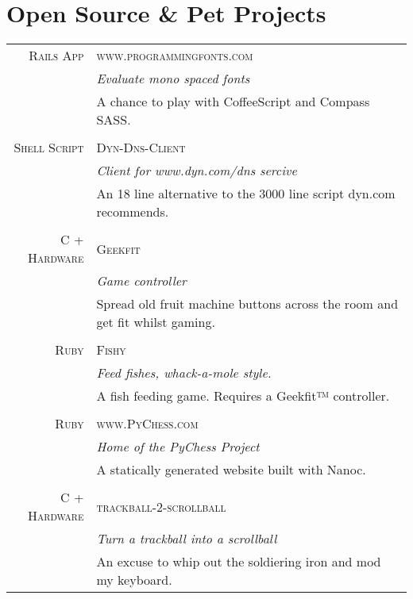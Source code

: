 \documentclass[a4paper,11pt]{article}
\begin{document}
\section{Open Source \& Pet Projects}
\begin{tabular}{r|p{11.2cm}}
  \textsc{Rails App} &\textsc{www.programmingfonts.com}\\
                     &\emph{Evaluate mono spaced fonts}\\
                     &\footnotesize{A chance to play with CoffeeScript and Compass SASS.}
  \\\multicolumn{2}{c}{} \\
  \textsc{Shell Script} &\textsc{Dyn-Dns-Client}\\
                        &\emph{Client for www.dyn.com/dns sercive}\\
                        &\footnotesize{An 18 line alternative to the 3000 line script dyn.com recommends.}
  \\\multicolumn{2}{c}{} \\
  \textsc{C + Hardware} &\textsc{Geekfit}\\
                        &\emph{Game controller}\\
                        &\footnotesize{Spread old fruit machine buttons across the room and get fit whilst gaming.}
  \\\multicolumn{2}{c}{} \\
  \textsc{Ruby}         &\textsc{Fishy}\\
                        &\emph{Feed fishes, whack-a-mole style.}\\
                        &\footnotesize{A fish feeding game. Requires a Geekfit™ controller.}
  \\\multicolumn{2}{c}{} \\
  \textsc{Ruby}         &\textsc{www.PyChess.com}\\
                        &\emph{Home of the PyChess Project}\\
                        &\footnotesize{A statically generated website built with Nanoc.}
  \\\multicolumn{2}{c}{} \\
  \textsc{C + Hardware} &\textsc{trackball-2-scrollball}\\
                        &\emph{Turn a trackball into a scrollball}\\
                        &\footnotesize{An excuse to whip out the soldiering iron and mod my keyboard.}
\end{tabular}
\end{document}
